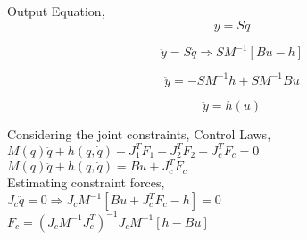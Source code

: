 \documentclass[14pt,a4paper,final]{article}
\begin{document}
Output Equation,
\begin{equation}
\dot{y} = S\dot{q}
\end{equation} 

\begin{equation}
\ddot{y} = S\ddot{q} \Rightarrow SM^{-1}[Bu-h]
\end{equation}

\begin{equation}
\ddot{y} = -SM^{-1}h + SM^{-1}B u
\end{equation}

\begin{equation}
\ddot{y} = h(u)
\end{equation}

Considering the joint constraints,
Control Laws, \\

$ M(q)\ddot{q}+h(q,\dot{q}) - J_1^TF_1 -J_2^TF_2 -J_c^TF_c = 0 $ \\

$ M(q)\ddot{q}+h(q,\dot{q}) = Bu + J_c^TF_c$ \\

Estimating constraint forces, \\

$J_c\ddot{q} = 0 \Rightarrow J_c M^{-1}[Bu + J_c^TF_c-h] = 0$ \\

$F_c = (J_cM^{-1}J_c^T)^{-1}J_cM^{-1}[h-Bu]$
\end{document}
